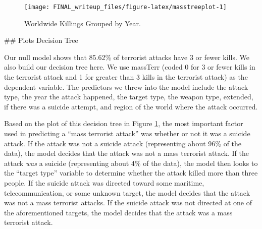 \documentclass[11pt,letterpaper,]{article}
\newenvironment{Shaded}{\begin{snugshade}}{\end{snugshade}}
\newcommand{\KeywordTok}[1]{\textcolor[rgb]{0.13,0.29,0.53}{\textbf{{#1}}}}
\newcommand{\DataTypeTok}[1]{\textcolor[rgb]{0.13,0.29,0.53}{{#1}}}
\newcommand{\StringTok}[1]{\textcolor[rgb]{0.31,0.60,0.02}{{#1}}}
\newcommand{\NormalTok}[1]{{#1}}
\theoremstyle{definition}
\theoremstyle{definition}
\theoremstyle{definition}
\theoremstyle{remark}
\begin{document}
\begin{figure}

{\centering \texttt{[image: FINAL\_writeup\_files/figure-latex/masstreeplot-1]} 

}

\caption{Worldwide Killings Grouped by Year.}\label{fig:masstreeplot}
\end{figure}

\begin{Shaded}
\begin{Highlighting}[]
\NormalTok{## Plots Decision Tree  }
\end{Highlighting}
\end{Shaded}

Our null model shows that 85.62\% of terrorist attacks have 3 or fewer
kills. We also build our decision tree here. We use massTerr (coded 0
for 3 or fewer kills in the terrorist attack and 1 for greater than 3
kills in the terrorist attack) as the dependent variable. The predictors
we threw into the model include the attack type, the year the attack
happened, the target type, the weapon type, extended, if there was a
suicide attempt, and region of the world where the attack occurred.

Based on the plot of this decision tree in Figure
\ref{fig:masstreeplot}, the most important factor used in predicting a
``mass terrorist attack'' was whether or not it was a suicide attack. If
the attack was not a suicide attack (representing about 96\% of the
data), the model decides that the attack was not a mass terrorist
attack. If the attack \emph{was} a suicide (representing about 4\% of
the data), the model then looks to the ``target type'' variable to
determine whether the attack killed more than three people. If the
suicide attack was directed toward some maritime, telecommunication, or
some unknown target, the model decides that the attack was not a mass
terrorist attacks. If the suicide attack was not directed at one of the
aforementioned targets, the model decides that the attack was a mass
terrorist attack.

\begin{Shaded}
\end{Shaded}
\end{document}
